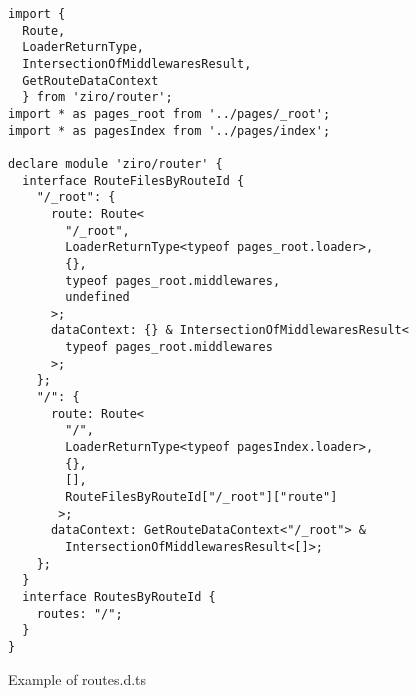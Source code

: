 \begin{figure}[H]
\begin{verbatim}
import {
  Route,
  LoaderReturnType,
  IntersectionOfMiddlewaresResult,
  GetRouteDataContext
  } from 'ziro/router';
import * as pages_root from '../pages/_root';
import * as pagesIndex from '../pages/index';

declare module 'ziro/router' {
  interface RouteFilesByRouteId {
    "/_root": {
      route: Route<
        "/_root",
        LoaderReturnType<typeof pages_root.loader>,
        {},
        typeof pages_root.middlewares,
        undefined
      >;
      dataContext: {} & IntersectionOfMiddlewaresResult<
        typeof pages_root.middlewares
      >;
    };
    "/": {
      route: Route<
        "/",
        LoaderReturnType<typeof pagesIndex.loader>,
        {},
        [],
        RouteFilesByRouteId["/_root"]["route"]
       >;
      dataContext: GetRouteDataContext<"/_root"> &
        IntersectionOfMiddlewaresResult<[]>;
    };
  }
  interface RoutesByRouteId {
    routes: "/";
  }
}
\end{verbatim}
\caption{Example of routes.d.ts}
\end{figure}


